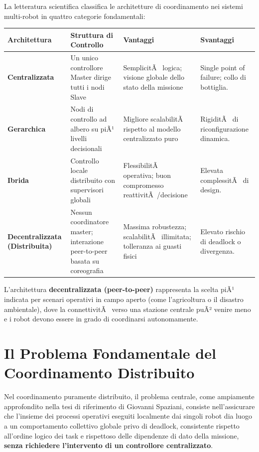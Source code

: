 ﻿\documentclass[11pt, a4paper]{report}
\begin{document}
La letteratura scientifica classifica le architetture di coordinamento nei sistemi multi-robot in quattro categorie fondamentali:

\begin{table}[h!]
\centering
\small
\renewcommand{\arraystretch}{1.3}
\begin{tabularx}{\textwidth}{>{\bfseries}l X X X}
\toprule
\rowcolor{lightBg}
Architettura & Struttura di Controllo & Vantaggi & Svantaggi \\
\midrule
Centralizzata & Un unico controllore Master dirige tutti i nodi Slave & SemplicitÃ  logica; visione globale dello stato della missione & Single point of failure; collo di bottiglia. \\
\hline
Gerarchica & Nodi di controllo ad albero su piÃ¹ livelli decisionali & Migliore scalabilitÃ  rispetto al modello centralizzato puro & RigiditÃ  di riconfigurazione dinamica. \\
\hline
Ibrida & Controllo locale distribuito con supervisori globali & FlessibilitÃ  operativa; buon compromesso reattivitÃ /decisione & Elevata complessitÃ  di design. \\
\hline
Decentralizzata (Distribuita) & Nessun coordinatore master; interazione peer-to-peer basata su coreografia & Massima robustezza; scalabilitÃ  illimitata; tolleranza ai guasti fisici & Elevato rischio di deadlock o divergenza. \\
\bottomrule
\end{tabularx}
\end{table}

L'architettura \textbf{decentralizzata (peer-to-peer)} rappresenta la scelta piÃ¹ indicata per scenari operativi in campo aperto (come l'agricoltura o il disastro ambientale), dove la connettivitÃ  verso una stazione centrale puÃ² venire meno e i robot devono essere in grado di coordinarsi autonomamente.

\section{Il Problema Fondamentale del Coordinamento Distribuito}

Nel coordinamento puramente distribuito, il problema centrale, come ampiamente approfondito nella tesi di riferimento di Giovanni Spaziani, consiste nell'assicurare che l'insieme dei processi operativi eseguiti localmente dai singoli robot dia luogo a un comportamento collettivo globale privo di deadlock, consistente rispetto all'ordine logico dei task e rispettoso delle dipendenze di dato della missione, \textbf{senza richiedere l'intervento di un controllore centralizzato}.
\end{document}
